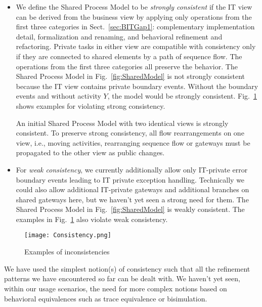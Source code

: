 \begin{itemize}

	\item We define the Shared Process Model to be \emph{strongly consistent} if the IT view can be derived from the business view by applying only operations from the first three categories in Sect.~\ref{sec:BITGap1}: complementary implementation detail, formalization and renaming, and behavioral refinement and refactoring. Private tasks in either view are compatible with consistency only if they are connected to shared elements by a path of sequence flow. 
	The operations from the first three categories all preserve the behavior. The Shared Process Model in Fig.~\ref{fig:SharedModel} is not strongly consistent because the IT view contains private boundary events. Without the boundary events and without activity $Y$, the model would be strongly consistent. Fig.~\ref{fig:Inconsistencies} shows examples for violating strong consistency. 	
	
	An initial Shared Process Model with two identical views is strongly consistent.
	To preserve strong consistency, all flow rearrangements on one view, i.e., moving activities, rearranging sequence flow or gateways must be propagated to the other view as public changes.

	\item For \emph{weak consistency}, we currently additionally allow only IT-private error boundary events leading to IT private exception handling. Technically we could also allow additional IT-private gateways and additional branches on shared gateways here, but we haven't yet seen a strong need for them. The Shared Process Model in Fig.~\ref{fig:SharedModel} is weakly consistent. The examples in Fig.~\ref{fig:Inconsistencies} also violate weak consistency.
	
\end{itemize}

\begin{figure}[b]
\vspace{-0.5cm}
\begin{center}
\texttt{[image: Consistency.png]} %
\caption{Examples of inconsistencies}
\label{fig:Inconsistencies}
\end{center}
\end{figure}	

We have used the simplest notion(s) of consistency such that all the refinement patterns we have encountered so far can be dealt with. We haven't yet seen, within our usage scenarios, the need for more complex notions based on behavioral equivalences such as trace equivalence or bisimulation.

